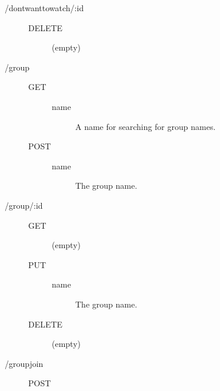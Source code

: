 \begin{description}
\begin{description}
\begin{description}
        \end{description}
    \end{description}
  \item [/dontwanttowatch/:id] \hfill
    \begin{description}
      \item [DELETE] \hfill
        \begin{description}
          \item [(empty)]
        \end{description}
    \end{description}
  \item [/group] \hfill
    \begin{description}
      \item [GET] \hfill
        \begin{description}
          \item [name] A name for searching for group names.
        \end{description}
      \item [POST] \hfill
        \begin{description}
          \item [name] The group name.
        \end{description}
    \end{description}
  \item [/group/:id] \hfill
    \begin{description}
      \item [GET] \hfill
        \begin{description}
          \item [(empty)]
        \end{description}
      \item [PUT] \hfill
        \begin{description}
          \item [name] The group name.
        \end{description}
      \item [DELETE] \hfill
        \begin{description}
          \item [(empty)]
        \end{description}
    \end{description}
  \item [/groupjoin] \hfill
    \begin{description}
      \item [POST] \hfill
        \begin{description}

\end{description}
\end{description}
\end{description}
